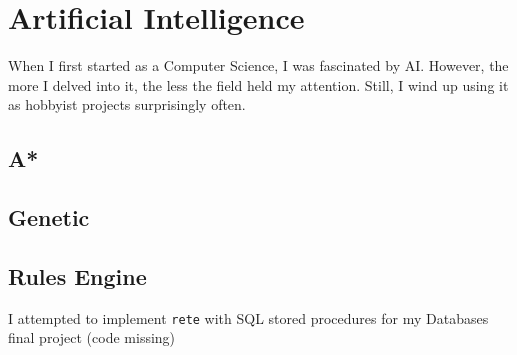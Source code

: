 \section{Artificial Intelligence}

When I first started as a Computer Science, I was fascinated by
AI. However, the more I delved into it, the less the field held my
attention. Still, I wind up using it as hobbyist projects surprisingly
often.

\subsection{A*}
\begin{description}
{\item[Clojure processing] }
{\item[Dancing Bits] }
{\item[AI class] }
\end{description}

\subsection{Genetic}
\begin{description}
{\item[Travelling Salesman] }
{\item[AI class] }
\end{description}

\subsection{Rules Engine}
\begin{description}
{\item[SQL] I attempted to implement \texttt{rete} with SQL stored procedures for my Databases final project (code missing)}
{\item[AI class] }
\end{description}
